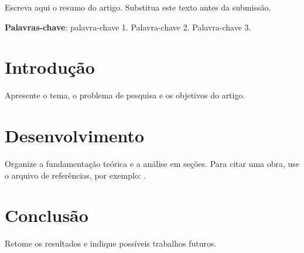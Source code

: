 \documentclass[12pt,oneside,a4paper]{abntex2}
\begin{document}
\imprimircapa
\imprimirfolhaderosto

\begin{resumo}
Escreva aqui o resumo do artigo. Substitua este texto antes da submissão.

\vspace{\onelineskip}
\noindent
\textbf{Palavras-chave}: palavra-chave 1. Palavra-chave 2. Palavra-chave 3.
\end{resumo}

\tableofcontents*
\clearpage

\textual
\chapter{Introdução}

Apresente o tema, o problema de pesquisa e os objetivos do artigo.

\chapter{Desenvolvimento}

Organize a fundamentação teórica e a análise em seções. Para citar uma obra,
use o arquivo de referências, por exemplo: \cite{exemplo2026}.

\chapter{Conclusão}

Retome os resultados e indique possíveis trabalhos futuros.

\postextual

\end{document}
